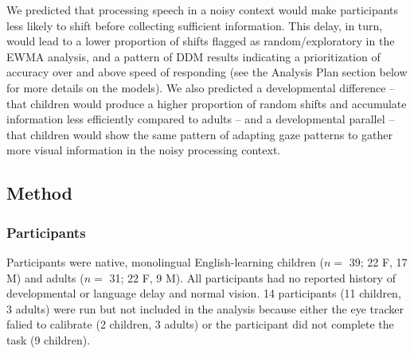 \documentclass[10pt, letterpaper]{article}
\begin{document}
We predicted that processing speech in a noisy context would make
participants less likely to shift before collecting sufficient
information. This delay, in turn, would lead to a lower proportion of
shifts flagged as random/exploratory in the EWMA analysis, and a pattern
of DDM results indicating a prioritization of accuracy over and above
speed of responding (see the Analysis Plan section below for more
details on the models). We also predicted a developmental difference --
that children would produce a higher proportion of random shifts and
accumulate information less efficiently compared to adults -- and a
developmental parallel -- that children would show the same pattern of
adapting gaze patterns to gather more visual information in the noisy
processing context.

\subsection{Method}\label{method}

\subsubsection{Participants}\label{participants}

Participants were native, monolingual English-learning children (\(n=\)
39; 22 F, 17 M) and adults (\(n=\) 31; 22 F, 9 M). All participants had
no reported history of developmental or language delay and normal
vision. 14 participants (11 children, 3 adults) were run but not
included in the analysis because either the eye tracker falied to
calibrate (2 children, 3 adults) or the participant did not complete the
task (9 children).
\end{document}

